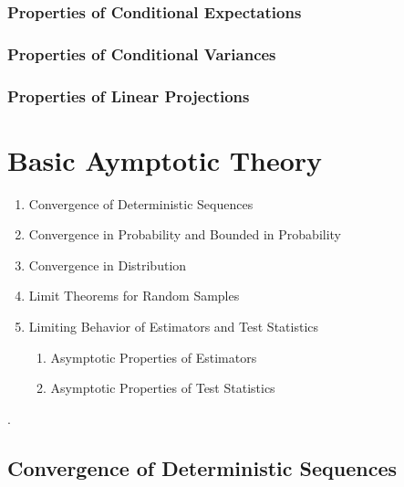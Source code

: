 \documentclass[11pt, oneside, a4paper, article]{article}
\numberwithin{equation}{section}
\begin{document}
\subsubsection{Properties of Conditional Expectations}

\subsubsection{Properties of Conditional Variances}

\subsubsection{Properties of Linear Projections}

\clearpage
\section{Basic Aymptotic Theory}

\noindent
\citet[C.3, p.35--45]{wool-2010}

\begin{enumerate}[noitemsep, label*=3.\arabic*.]
\item  Convergence of Deterministic Sequences
\item  Convergence in Probability and Bounded in Probability
\item  Convergence in Distribution
\item  Limit Theorems for Random Samples

\item  Limiting Behavior of Estimators and Test Statistics
\begin{enumerate}[noitemsep, leftmargin=1 em, label*=\arabic*.]
\item Asymptotic Properties of Estimators
\item Asymptotic Properties of Test Statistics
\end{enumerate}
\end{enumerate}

.

\subsection{Convergence of Deterministic Sequences}
\end{document}
